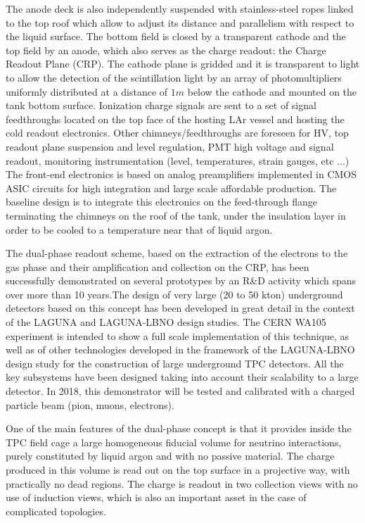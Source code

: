 The anode deck is also independently suspended with stainless-steel ropes linked to the top roof  which allow to adjust its distance and parallelism with respect to the liquid surface.  The bottom field is  closed by a transparent cathode and the top field by an anode, which also  serves as the charge readout: the Charge Readout Plane (CRP).  The cathode plane is gridded and it is transparent to light to allow the detection of the scintillation light by an array of photomultipliers uniformly distributed  at a distance of $1m$  below the cathode and mounted on the tank bottom surface. Ionization charge signals are sent to a set of signal feedthroughs located on the top face of the hosting LAr vessel and hosting the cold readout electronics. Other chimneys/feedthroughs are foreseen for HV, top readout plane suspension and level regulation, PMT high voltage and signal readout, monitoring instrumentation (level, temperatures, strain gauges, etc ...) The front-end electronics is based on analog preamplifiers implemented in CMOS ASIC circuits for high integration and large scale affordable production. The baseline design is to integrate this electronics on the feed-through flange terminating the chimneys on the roof of the tank, under the insulation layer in order to be cooled to a temperature near that of liquid argon.

The dual-phase readout scheme, based on the extraction of the electrons to the gas phase and their amplification and collection on the CRP, has been successfully demonstrated on several prototypes  by an R\&D activity which spans over more than 10 years.The design of very large (20 to 50 kton) underground detectors based on this concept has been developed in great detail in the context of the LAGUNA and LAGUNA-LBNO design studies.  The CERN WA105 experiment is intended to show a full scale implementation of this technique, as well as of other technologies developed in the framework of the LAGUNA-LBNO design study for the construction of large underground TPC detectors.  All the key subsystems have been designed taking into account their scalability to a large detector.  In 2018, this demonstrator will be tested and calibrated with a charged particle beam (pion, muons, electrons).

One of the main features of the dual-phase concept is that it provides inside the TPC field cage a large homogeneous fiducial volume for neutrino interactions, purely constituted by liquid argon and with no passive material. The charge produced in this volume is read out on the top surface in a projective way, with practically no dead regions. The charge is readout in two collection views with no use of induction views, which is also an important asset in the case of complicated topologies. 

